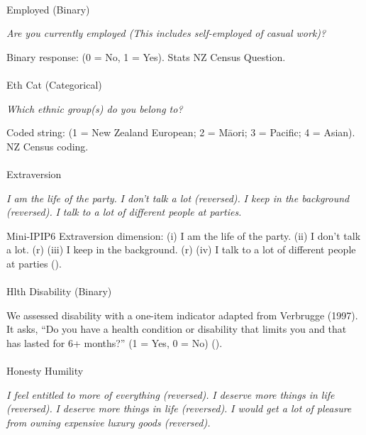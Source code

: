 \documentclass[
  single column]{article}
\makeatletter
\let\oldparagraph\paragraph
\renewcommand{\paragraph}{
    \@ifstar
      \xxxParagraphStar
      \xxxParagraphNoStar
  }
\newcommand{\xxxParagraphStar}[1]{\oldparagraph*{#1}\mbox{}}
\newcommand{\xxxParagraphNoStar}[1]{\oldparagraph{#1}\mbox{}}
\makeatother
\begin{document}
\paragraph{Employed (Binary)}\label{employed-binary}

\emph{Are you currently employed (This includes self-employed of casual
work)?}

Binary response: (0 = No, 1 = Yes). Stats NZ Census Question.

\paragraph{Eth Cat (Categorical)}\label{eth-cat-categorical}

\emph{Which ethnic group(s) do you belong to?}

Coded string: (1 = New Zealand European; 2 = Māori; 3 = Pacific; 4 =
Asian). NZ Census coding.

\paragraph{Extraversion}\label{extraversion}

\emph{I am the life of the party.} \emph{I don't talk a lot (reversed).}
\emph{I keep in the background (reversed).} \emph{I talk to a lot of
different people at parties.}

Mini-IPIP6 Extraversion dimension: (i) I am the life of the party. (ii)
I don't talk a lot. (r) (iii) I keep in the background. (r) (iv) I talk
to a lot of different people at parties
().

\paragraph{Hlth Disability (Binary)}\label{hlth-disability-binary}

We assessed disability with a one-item indicator adapted from Verbrugge
(1997). It asks, ``Do you have a health condition or disability that
limits you and that has lasted for 6+ months?'' (1 = Yes, 0 = No)
().

\paragraph{Honesty Humility}\label{honesty-humility}

\emph{I feel entitled to more of everything (reversed).} \emph{I deserve
more things in life (reversed).} \emph{I deserve more things in life
(reversed).} \emph{I would get a lot of pleasure from owning expensive
luxury goods (reversed).}
\end{document}
